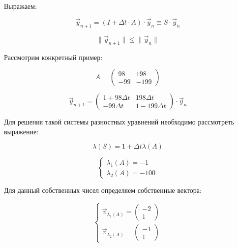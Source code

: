 \documentclass[10pt,a4paper]{article}
\begin{document}
	Выражаем:
	
	\begin{equation}
		\vec{y}_{n + 1} = \left(I + \Delta t\cdot A\right)\cdot 
		\vec{y}_{n} \equiv S \cdot  \vec{y}_{n}
	\end{equation}
	
	\begin{equation}
		\parallel \vec{y}_{n + 1}\parallel \leqslant \parallel\vec{y}_{n}
		\parallel
	\end{equation}
	
	Рассмотрим конкретный пример:
	
	\begin{equation}
		A = \begin{pmatrix}
			98 & 198\\
			-99 & -199
		\end{pmatrix}
	\end{equation}
	
	\begin{equation}
		\vec{y}_{n + 1} = \begin{pmatrix}
			1+98 \Delta t & 198\Delta t\\
			-99\Delta t & 1-199\Delta t
		\end{pmatrix}
		\cdot\vec{y}_{n}
	\end{equation}
	
	Для решения такой системы разностных уравнений необходимо рассмотреть 
	выражение:
	
	\begin{equation}
		\lambda\left(S\right) = 1 + \Delta t\lambda\left(A\right) 
	\end{equation}
	
	\begin{equation}
		\begin{cases}
			\lambda_{1}\left(A\right) = -1
			\\
			\lambda_{2}\left(A\right) = -100
		\end{cases}
	\end{equation}
	
	Для данный собственных чисел определяем собственные вектора:
	
	\begin{equation}
		\begin{cases}
			\vec{v}_{\lambda_{1}\left(A\right)} = \begin{pmatrix}
			-2\\1
			\end{pmatrix}
			\\
			\vec{v}_{\lambda_{2}\left(A\right)} = \begin{pmatrix}
			-1\\1
			\end{pmatrix}
		\end{cases}
	\end{equation}
	
\end{document}
